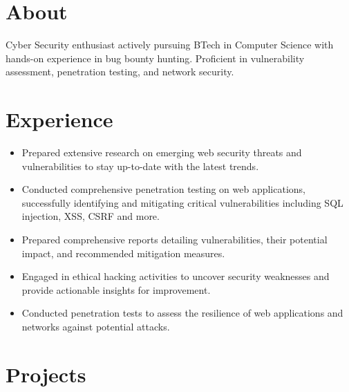 \documentclass[]{roshan-resume}
\begin{document}
	\hfill
	\begin{minipage}[t]{0.66\textwidth} 
		
		\section{About}
		Cyber Security enthusiast actively pursuing BTech in Computer Science with hands-on experience in bug bounty hunting. Proficient in vulnerability assessment, penetration testing, and network security. 
		
		
		\section{Experience}
		\begin{itemize}
			\item Prepared extensive research on emerging web security threats and vulnerabilities to stay up-to-date with the latest trends. \\
			\item Conducted comprehensive penetration testing on web applications, successfully identifying and mitigating critical vulnerabilities including SQL injection, XSS, CSRF and more.
			\item Prepared comprehensive reports detailing
			vulnerabilities, their potential impact, and
			recommended mitigation measures. \\
			\item Engaged in ethical hacking activities to uncover
			security weaknesses and provide actionable insights for
			improvement.\\
			\item Conducted penetration tests to assess the resilience of
			web applications and networks against potential
			attacks.\\
		\end{itemize}
		
		\section{Projects}

\end{minipage}
\end{document}
